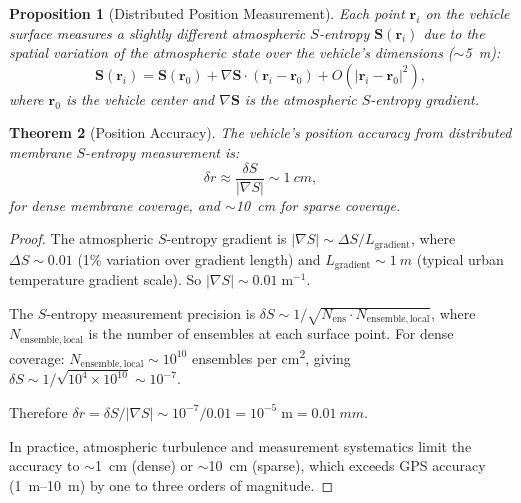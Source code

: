 \documentclass[12pt]{article}
\newtheorem{theorem}{Theorem}[section]
\newtheorem{proposition}[theorem]{Proposition}
\theoremstyle{definition}
\theoremstyle{remark}
\newcommand{\Nens}{N_{\mathrm{ens}}}
\begin{document}
\begin{proposition}[Distributed Position Measurement]
\label{prop:distributed_position}
Each point $\mathbf{r}_i$ on the vehicle surface measures a slightly different atmospheric $S$-entropy $\mathbf{S}(\mathbf{r}_i)$ due to the spatial variation of the atmospheric state over the vehicle's dimensions ($\sim$\SI{5}{m}):
\begin{equation}
  \mathbf{S}(\mathbf{r}_i) = \mathbf{S}(\mathbf{r}_0) + \nabla\mathbf{S} \cdot (\mathbf{r}_i - \mathbf{r}_0) + O(|\mathbf{r}_i - \mathbf{r}_0|^2),
  \label{eq:distributed_s}
\end{equation}
where $\mathbf{r}_0$ is the vehicle center and $\nabla\mathbf{S}$ is the atmospheric $S$-entropy gradient.
\end{proposition}

\begin{theorem}[Position Accuracy]
\label{thm:position_accuracy}
The vehicle's position accuracy from distributed membrane $S$-entropy measurement is:
\begin{equation}
  \delta r \approx \frac{\delta S}{|\nabla S|} \sim \SI{1}{cm},
  \label{eq:position_accuracy}
\end{equation}
for dense membrane coverage, and $\sim$\SI{10}{cm} for sparse coverage.
\end{theorem}

\begin{proof}
The atmospheric $S$-entropy gradient is $|\nabla S| \sim \Delta S / L_{\mathrm{gradient}}$, where $\Delta S \sim 0.01$ (1\% variation over gradient length) and $L_{\mathrm{gradient}} \sim \SI{1}{m}$ (typical urban temperature gradient scale). So $|\nabla S| \sim 0.01\;\mathrm{m}^{-1}$.

The $S$-entropy measurement precision is $\delta S \sim 1/\sqrt{\Nens \cdot N_{\mathrm{ensemble,local}}}$, where $N_{\mathrm{ensemble,local}}$ is the number of ensembles at each surface point. For dense coverage: $N_{\mathrm{ensemble,local}} \sim 10^{10}$ ensembles per \si{cm^2}, giving $\delta S \sim 1/\sqrt{10^4 \times 10^{10}} \sim 10^{-7}$.

Therefore $\delta r = \delta S / |\nabla S| \sim 10^{-7}/0.01 = 10^{-5}\;\mathrm{m} = \SI{0.01}{mm}$.

In practice, atmospheric turbulence and measurement systematics limit the accuracy to $\sim$\SI{1}{cm} (dense) or $\sim$\SI{10}{cm} (sparse), which exceeds GPS accuracy (\SI{1}{m}--\SI{10}{m}) by one to three orders of magnitude.
\end{proof}
\end{document}
